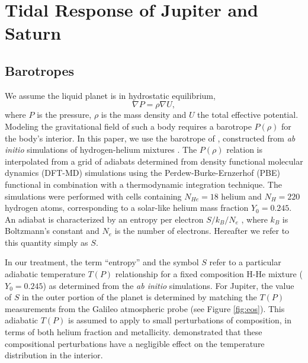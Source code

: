 \chapter{Tidal Response of Jupiter and Saturn}\label{chap7}

\section{Barotropes}


We assume the liquid planet is in hydrostatic equilibrium,
%
\begin{equation} \nabla P = \rho \nabla U,     
   \label{eq:hydrostatic} \end{equation}
%
where $P$ is the pressure, $\rho$ is the mass density and $U$ the total effective
potential. Modeling the gravitational field of such a body requires a barotrope
$P(\rho)$ for the body's interior. In this paper, we use the barotrope of
\citet{hubbard2016}, constructed from \textit{ab initio} simulations of
hydrogen-helium mixtures \citep{militzer2013a,militzer2013b}. The $P(\rho)$ relation
is interpolated from a grid of adiabats determined from density functional 
molecular dynamics (DFT-MD) simulations using the Perdew-Burke-Ernzerhof (PBE) functional
\citep{PBE} in combination with a thermodynamic integration technique. The
simulations were performed with cells containing $N_{He}=18$ helium and $N_{H}=220$
hydrogen atoms, corresponding to a solar-like helium mass fraction $Y_0=0.245$. An
adiabat is characterized by an entropy per electron $S/k_B/N_e$
\citep{militzer2013b}, where $k_B$ is Boltzmann's constant and $N_e$ is the number of
electrons. Hereafter we refer to this quantity simply as $S$.

In our treatment, the term ``entropy'' and the symbol $S$ refer to a particular
adiabatic temperature $T(P)$ relationship for a fixed composition H-He mixture
($Y_0=0.245$) as determined from the \textit{ab initio} simulations.  For Jupiter,
the value of $S$ in the outer portion of the planet is determined by matching the
$T(P)$ measurements from the Galileo atmospheric probe (see Figure \ref{fig:eos}).
This adiabatic $T(P)$ is assumed to apply to small perturbations of composition, in
terms of both helium fraction and metallicity. \citet{hubbard2016} demonstrated that
these compositional perturbations have a negligible effect on the temperature
distribution in the interior.

